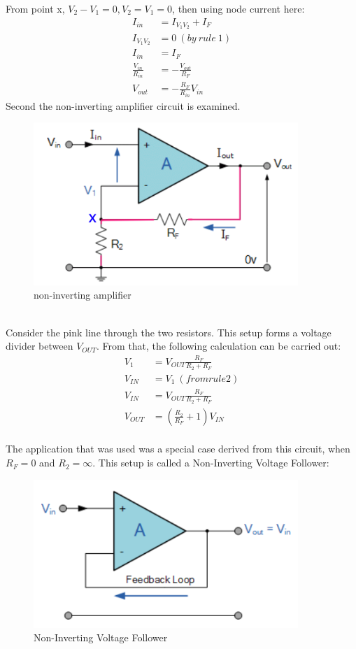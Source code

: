 \documentclass[12 pt, a4paper]{thesis}
\begin{document}
From point x, $V_2-V_1=0, V_2=V_1=0$, then using node current here:
\begin{equation}
\begin{split}
I_{in} &=I_{V_{1}V_{2}}+I_F\\
I_{V_{1}V_{2}} &=0 \:(by\: rule\: 1)\\
I_{in} &=I_F\\
\frac{V_{in}}{R_{in}} &=-\frac{V_{out}}{R_F}\\
V_{out} &=-\frac{R_F}{R_{in}}V_{in}
\end{split}
\end{equation}
\vspace{10mm}
Second the non-inverting amplifier circuit is examined.
\begin{figure}[hbt!]
\centering
\includegraphics[width=100mm]{OpAmp_3.png}
\caption{non-inverting amplifier}
\end{figure}
\\Consider the pink line through the two resistors. This setup forms a voltage divider between $V_{OUT}$. From that, the following calculation can be carried out:\\
\begin{equation}
\begin{split}
V_1 &=V_{OUT}\frac{R_F}{R_2+R_F}\\
V_{IN} &=V_1 \:(from rule 2)\\
V_{IN} &=V_{OUT}\frac{R_F}{R_2+R_F}\\
V_{OUT} &= (\frac{R_2}{R_F}+1)V_{IN}
\end{split}
\end{equation}
\\The application that was used was a special case derived from this circuit, when $R_F=0$ and $R_2=\infty$. This setup is called a Non-Inverting Voltage Follower:\\
\begin{figure}[hbt!]
\centering
\includegraphics[width = 100mm]{OpAmp_4.png}
\caption{Non-Inverting Voltage Follower}
\end{figure}
\end{document}
